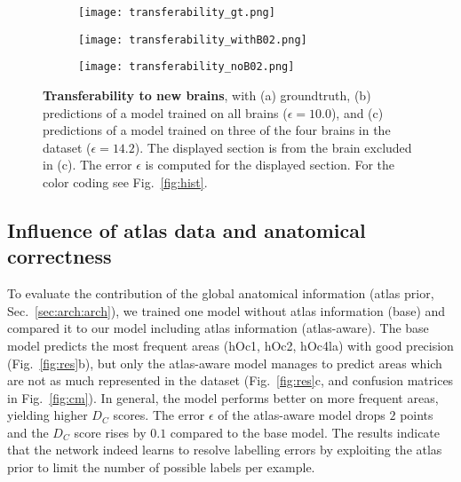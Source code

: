 \documentclass{article}
\begin{document}
\begin{figure}[t!]
	\centering
	\begin{subfigure}{.32\columnwidth}
		\centering
		\texttt{[image: transferability\_gt.png]}
	\end{subfigure}%
	\begin{subfigure}{.32\columnwidth}
		\centering
		\texttt{[image: transferability\_withB02.png]}
	\end{subfigure}%
	\begin{subfigure}{.32\columnwidth}
		\centering
		\texttt{[image: transferability\_noB02.png]}
	\end{subfigure}%
	\caption{
		\textbf{Transferability to new brains}, 
		with (a) groundtruth,
		(b) predictions of a model trained on all brains ($\epsilon=10.0$),
		and (c) predictions of a model trained on three of the four brains in the dataset ($\epsilon=14.2$). 
		The displayed section is from the brain excluded in (c). 
		The error $\epsilon$ is computed for the displayed section.
		For the color coding see Fig.~\ref{fig:hist}.
	}
	\label{fig:transfer}
\end{figure}

\vspace*{-.5\baselineskip}
\subsection{Influence of atlas data and anatomical correctness}
\label{sec:res:correct}
\vspace*{-.5\baselineskip}

To evaluate the contribution of the global anatomical information (atlas prior, Sec.~\ref{sec:arch:arch}), we trained one model without atlas information (base) and compared it to our model including atlas information (atlas-aware). 
The base model predicts the most frequent areas (hOc1, hOc2, hOc4la) with good precision (Fig.~\ref{fig:res}b), but only the atlas-aware model manages to predict areas which are not as much represented in the dataset (Fig.~\ref{fig:res}c, and confusion matrices in Fig.~\ref{fig:cm}). 
In general, the model performs better on more frequent areas, yielding higher $D_C$ scores. 
The error $\epsilon$ of the atlas-aware model drops $2$ points and the $D_C$ score rises by $0.1$ compared to the base model.
The results indicate that the network indeed learns to resolve labelling errors by exploiting the atlas prior to limit the number of possible labels per example.
\end{document}
